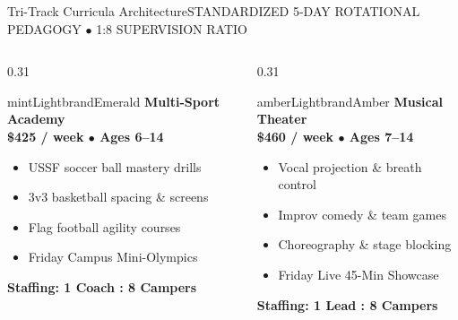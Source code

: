 \documentclass[aspectratio=169,9pt]{beamer}
\begin{document}
\begin{frame}{Tri-Track Curricula Architecture}{STANDARDIZED 5-DAY ROTATIONAL PEDAGOGY $\bullet$ 1:8 SUPERVISION RATIO}

\begin{columns}[T]
  \begin{column}{0.31\textwidth}
    \begin{execbox}{mintLight}{brandEmerald}
      \textcolor{brandEmerald}{\textbf{\scriptsize Multi-Sport Academy}} \\[1pt]
      \textbf{\tiny \$425 / week $\bullet$ Ages 6--14} \\[2pt]
      \tiny
      \begin{itemize}
        \item USSF soccer ball mastery drills
        \item 3v3 basketball spacing \& screens
        \item Flag football agility courses
        \item Friday Campus Mini-Olympics
      \end{itemize}
      \vskip2pt
      \textcolor{brandEmerald}{\textbf{\tiny Staffing: 1 Coach : 8 Campers}}
    \end{execbox}
  \end{column}

  \begin{column}{0.31\textwidth}
    \begin{execbox}{amberLight}{brandAmber}
      \textcolor{brandAmber}{\textbf{\scriptsize Musical Theater}} \\[1pt]
      \textbf{\tiny \$460 / week $\bullet$ Ages 7--14} \\[2pt]
      \tiny
      \begin{itemize}
        \item Vocal projection \& breath control
        \item Improv comedy \& team games
        \item Choreography \& stage blocking
        \item Friday Live 45-Min Showcase
      \end{itemize}
      \vskip2pt
      \textcolor{brandAmber}{\textbf{\tiny Staffing: 1 Lead : 8 Campers}}
    \end{execbox}
  \end{column}


\end{columns}
\end{frame}
\end{document}
